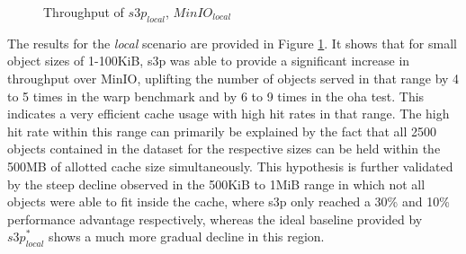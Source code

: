 \begin{figure}[h!]
	\centering
	\caption{Throughput of ${s3p}_{local}$, ${MinIO}_{local}$}
	\label{fig:throughputlocal}
\end{figure}

The results for the \textit{local} scenario are provided in Figure \ref{fig:throughputlocal}.  It shows that for small object sizes of 1-100KiB, s3p was able to provide a significant increase in throughput over MinIO, uplifting the number of objects served in that range by 4 to 5 times in the warp benchmark and by 6 to 9 times in the oha test. This indicates a very efficient cache usage with high hit rates in that range. The high hit rate within this range can primarily be explained by the fact that all 2500 objects contained in the dataset for the respective sizes can be held within the 500MB of allotted cache size simultaneously. This hypothesis is further validated by the steep decline observed in the 500KiB to 1MiB range in which not all objects were able to fit inside the cache, where s3p only reached a 30\% and 10\% performance advantage respectively, whereas the ideal baseline provided by ${s3p}^{*}_{local}$ shows a much more gradual decline in this region.

